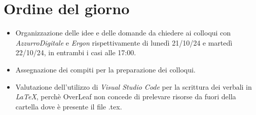 \section{Ordine del giorno}

\begin{itemize}
    \item Organizzazione delle idee e delle domande da chiedere ai colloqui con \emph{AzzurroDigitale} e \emph{Ergon} rispettivamente di lunedì 21/10/24 e martedì 22/10/24, in entrambi i casi alle 17:00.
    \item Assegnazione dei compiti per la preparazione dei colloqui.
    \item Valutazione dell'utilizzo di \emph{Visual Studio Code} per la scrittura dei verbali in \emph{LaTeX}, perchè OverLeaf non concede di prelevare risorse da fuori della cartella dove è presente il file .tex.
\end{itemize}